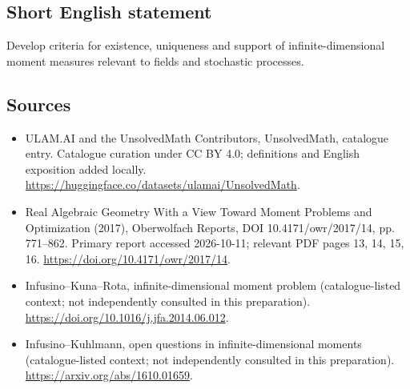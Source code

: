 \documentclass[11pt]{article}
\begin{document}
\subsection{Short English statement}
Develop criteria for existence, uniqueness and support of infinite-dimensional moment measures relevant to fields and stochastic processes.
\subsection{Sources}
\begin{itemize}
\item[\hypertarget{source:statement:1}{S1}] ULAM.AI and the UnsolvedMath Contributors, UnsolvedMath, catalogue entry. Catalogue curation under CC BY 4.0; definitions and English exposition added locally.
\url{https://huggingface.co/datasets/ulamai/UnsolvedMath}.
\item[\hypertarget{source:statement:2}{S2}] Real Algebraic Geometry With a View Toward Moment Problems and Optimization (2017), Oberwolfach Reports, DOI 10.4171/owr/2017/14, pp. 771--862. Primary report accessed 2026-10-11; relevant PDF pages 13, 14, 15, 16.
\url{https://doi.org/10.4171/owr/2017/14}.
\item[\hypertarget{source:statement:3}{S3}] Infusino--Kuna--Rota, infinite-dimensional moment problem (catalogue-listed context; not independently consulted in this preparation).
\url{https://doi.org/10.1016/j.jfa.2014.06.012}.
\item[\hypertarget{source:statement:4}{S4}] Infusino--Kuhlmann, open questions in infinite-dimensional moments (catalogue-listed context; not independently consulted in this preparation).
\url{https://arxiv.org/abs/1610.01659}.
\end{itemize}
\label{end:statement}
\end{document}
